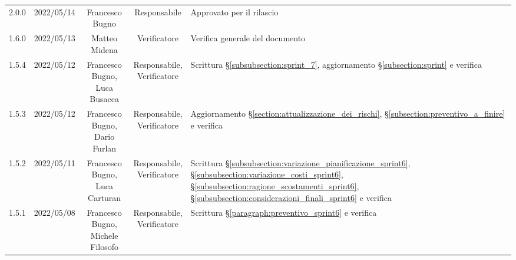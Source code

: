 \begin{center}
\begin{longtable}[c]{c | c | c | c | p{5cm}}
		2.0.0                                                      & 2022/05/14 & Francesco Bugno                        & Responsabile   & Approvato per il rilascio                                                                                                                 \\
		1.6.0                                                      & 2022/05/13 & Matteo Midena                          & Verificatore   & Verifica generale del documento                                                                                                           \\
		1.5.4                                                      & 2022/05/12 & \Shortunderstack{Francesco Bugno,                                                                                                                                                                   \\Luca Busacca} & \Shortunderstack{Responsabile,\\Verificatore} & Scrittura §\ref{subsubsection:sprint_7}, aggiornamento §\ref{subsection:sprint} e verifica\\
		1.5.3                                                      & 2022/05/12 & \Shortunderstack{Francesco Bugno,                                                                                                                                                                   \\Dario Furlan} & \Shortunderstack{Responsabile,\\Verificatore} & Aggiornamento §\ref{section:attualizzazione_dei_rischi}, §\ref{subsection:preventivo_a_finire} e verifica\\
		1.5.2                                                      & 2022/05/11 & \Shortunderstack{Francesco Bugno,                                                                                                                                                                   \\Luca Carturan} & \Shortunderstack{Responsabile,\\Verificatore} & Scrittura §\ref{subsubsection:variazione_pianificazione_sprint6}, §\ref{subsubsection:variazione_costi_sprint6}, §\ref{subsubsection:ragione_scostamenti_sprint6}, §\ref{subsubsection:considerazioni_finali_sprint6} e verifica\\
		1.5.1                                                      & 2022/05/08 & \Shortunderstack{Francesco Bugno,                                                                                                                                                                   \\Michele Filosofo} & \Shortunderstack{Responsabile,\\Verificatore} & Scrittura §\ref{paragraph:preventivo_sprint6} e verifica\\

\end{longtable}
\end{center}
